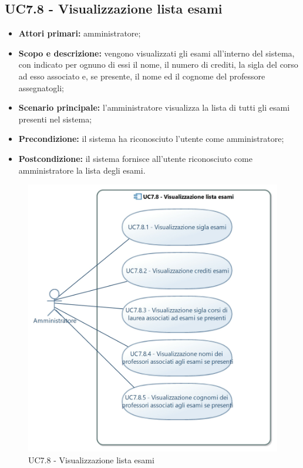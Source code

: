 \documentclass[AnalisiDeiRequisiti.tex]{subfiles}
\begin{document}
\subsection{UC7.8 - Visualizzazione lista esami}
\begin{itemize}
	\item \textbf{Attori primari:} amministratore;
	\item \textbf{Scopo e descrizione:} vengono visualizzati gli esami all'interno del sistema, con indicato per ognuno di essi il nome, il numero di crediti, la sigla del corso ad esso associato e, se presente, il nome ed il cognome del professore assegnatogli;
	\item \textbf{Scenario principale:} l'amministratore visualizza la lista di tutti gli esami presenti nel sistema;
	\item \textbf{Precondizione:} il sistema ha riconosciuto l'utente come amministratore; 
	\item \textbf{Postcondizione:} il sistema fornisce all'utente riconosciuto come amministratore la lista degli esami.
\end{itemize}
\begin{figure}[H]
	\centering
	\includegraphics[width=0.7\linewidth]{UC7_8.jpg}
	\caption{UC7.8 - Visualizzazione lista esami}
	\label{fig:UC7.8 - Visualizzazione lista esami}
\end{figure}
\end{document}
